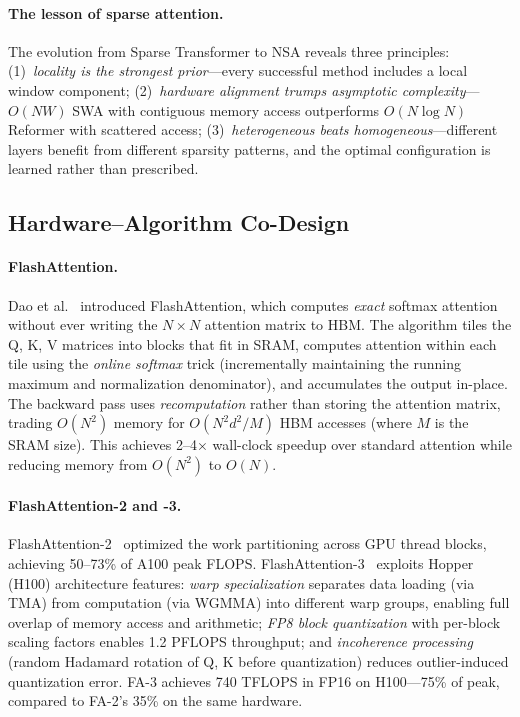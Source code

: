 \documentclass[11pt,a4paper]{article}
\begin{document}
\paragraph{The lesson of sparse attention.}
The evolution from Sparse Transformer to NSA reveals three principles: (1)~\emph{locality is the strongest prior}---every successful method includes a local window component; (2)~\emph{hardware alignment trumps asymptotic complexity}---$O(NW)$ SWA with contiguous memory access outperforms $O(N \log N)$ Reformer with scattered access; (3)~\emph{heterogeneous beats homogeneous}---different layers benefit from different sparsity patterns, and the optimal configuration is learned rather than prescribed.


\subsection{Hardware--Algorithm Co-Design}
\label{subsec:hw-attn}

\paragraph{FlashAttention.}
Dao et al.~\cite{dao2022flashattention} introduced FlashAttention, which computes \emph{exact} softmax attention without ever writing the $N \times N$ attention matrix to HBM. The algorithm tiles the Q, K, V matrices into blocks that fit in SRAM, computes attention within each tile using the \emph{online softmax} trick (incrementally maintaining the running maximum and normalization denominator), and accumulates the output in-place. The backward pass uses \emph{recomputation} rather than storing the attention matrix, trading $O(N^2)$ memory for $O(N^2 d^2/M)$ HBM accesses (where $M$ is the SRAM size). This achieves 2--4$\times$ wall-clock speedup over standard attention while reducing memory from $O(N^2)$ to $O(N)$.

\paragraph{FlashAttention-2 and -3.}
FlashAttention-2~\cite{dao2023flashattention2} optimized the work partitioning across GPU thread blocks, achieving 50--73\% of A100 peak FLOPS. FlashAttention-3~\cite{shah2024flashattention3} exploits Hopper (H100) architecture features: \emph{warp specialization} separates data loading (via TMA) from computation (via WGMMA) into different warp groups, enabling full overlap of memory access and arithmetic; \emph{FP8 block quantization} with per-block scaling factors enables 1.2 PFLOPS throughput; and \emph{incoherence processing} (random Hadamard rotation of Q, K before quantization) reduces outlier-induced quantization error. FA-3 achieves 740 TFLOPS in FP16 on H100---75\% of peak, compared to FA-2's 35\% on the same hardware.
\end{document}
